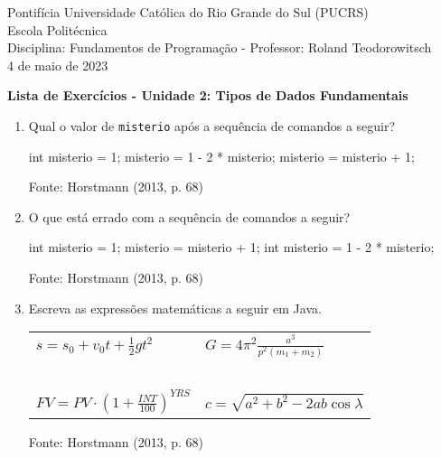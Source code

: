 \documentclass[onecolumn,a4paper,10pt]{report}
\newcommand{\+}{\, + \,}
\newcommand{\<}{\hspace*{-0.4cm}}
\begin{document}
\singlespacing

\begin{center}
Pontifícia Universidade Católica do Rio Grande do Sul (PUCRS)\\
Escola Politécnica\\
Disciplina: Fundamentos de Programação - Professor: Roland Teodorowitsch\\
4 de maio de 2023
\end{center}

\begin{center}
\textbf{Lista de Exercícios - Unidade 2: Tipos de Dados Fundamentais}
\end{center}

\begin{enumerate}[1.]

\item Qual o valor de \texttt{misterio} após a sequência de comandos a seguir?\\
\begin{javacode}
int misterio = 1;
misterio = 1 - 2 * misterio;
misterio = misterio + 1;
\end{javacode}
{\tiny Fonte: Horstmann (2013, p. 68)}

\item O que está errado com a sequência de comandos a seguir?\\
\begin{javacode}
int misterio = 1;
misterio = misterio + 1;
int misterio = 1 - 2 * misterio;
\end{javacode}
{\tiny Fonte: Horstmann (2013, p. 68)}

\item Escreva as expressões matemáticas a seguir em Java.
\begin{center}
\begin{tabular}{p{5cm}p{5cm}}
$\displaystyle s = s_0 + v_0t+\frac{1}{2}gt^2 $ & $\displaystyle G = 4\pi^2\frac{a^3}{p^2(m_1+m_2)} $ \\
~ & ~\\
$\displaystyle \mathit{FV} = \mathit{PV} \cdot \left( 1 + \frac{\mathit{INT}}{100} \right)^{\mathit{YRS}} $ & $\displaystyle c = \sqrt{a^2+b^2-2ab\cos{\lambda}} $ \\
\end{tabular}
\end{center}
{\tiny Fonte: Horstmann (2013, p. 68)}


\end{enumerate}
\end{document}
